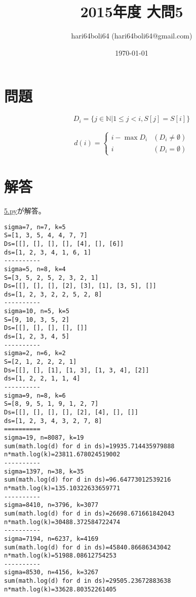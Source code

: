 \documentclass[a4paper, 10pt, dvipdfmx]{jlreq}
\begin{document}
\title{2015年度 大問5}
\author{hari64boli64 (hari64boli64@gmail.com)}
\date{\today}
\maketitle

\section{問題}

$$
  D_i=\{ j \in \mathbb{N} | 1 \leq j < i, S[j]=S[i] \}
$$

\begin{align*}
  d(i)=
  \begin{cases}
    i-\max D_i & (D_i \neq \emptyset) \\
    i          & (D_i = \emptyset)
  \end{cases}
\end{align*}

\section{解答}

\href{./5.py}{5.py}が解答。



\begin{lstlisting}[caption=output, label=code:output]
sigma=7, n=7, k=5
S=[1, 3, 5, 4, 4, 7, 7]
Ds=[[], [], [], [], [4], [], [6]]
ds=[1, 2, 3, 4, 1, 6, 1]
----------
sigma=5, n=8, k=4
S=[3, 5, 2, 5, 2, 3, 2, 1]
Ds=[[], [], [], [2], [3], [1], [3, 5], []]
ds=[1, 2, 3, 2, 2, 5, 2, 8]
----------
sigma=10, n=5, k=5
S=[9, 10, 3, 5, 2]
Ds=[[], [], [], [], []]
ds=[1, 2, 3, 4, 5]
----------
sigma=2, n=6, k=2
S=[2, 1, 2, 2, 2, 1]
Ds=[[], [], [1], [1, 3], [1, 3, 4], [2]]
ds=[1, 2, 2, 1, 1, 4]
----------
sigma=9, n=8, k=6
S=[8, 9, 5, 1, 9, 1, 2, 7]
Ds=[[], [], [], [], [2], [4], [], []]
ds=[1, 2, 3, 4, 3, 2, 7, 8]
==========
sigma=19, n=8087, k=19
sum(math.log(d) for d in ds)=19935.714435979888
n*math.log(k)=23811.678024519002
----------
sigma=1397, n=38, k=35
sum(math.log(d) for d in ds)=96.64773012539216
n*math.log(k)=135.10322633659771
----------
sigma=8410, n=3796, k=3077
sum(math.log(d) for d in ds)=26698.671661842043
n*math.log(k)=30488.372584722474
----------
sigma=7194, n=6237, k=4169
sum(math.log(d) for d in ds)=45840.86686343042
n*math.log(k)=51988.08612754253
----------
sigma=8530, n=4156, k=3267
sum(math.log(d) for d in ds)=29505.23672883638
n*math.log(k)=33628.80352261405
\end{lstlisting}
\end{document}
